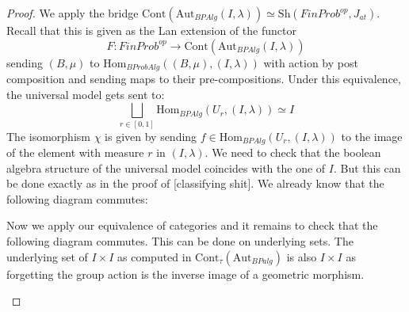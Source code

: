 \documentclass[a4paper]{amsproc}
\theoremstyle{plain}
\theoremstyle{definition}
\theoremstyle{remark}
\numberwithin{equation}{section}
\begin{document}
\begin{proof} We apply the bridge $\text{Cont}(\text{Aut}_{BPAlg}(I,\lambda))\simeq \text{Sh}(FinProb^{op},J_{at})$. Recall that this is given as the Lan extension of the functor 
\[F:FinProb^{op}\rightarrow \text{Cont}(\text{Aut}_{BPAlg}(I,\lambda))\]
 sending $(B,\mu)$ to $\text{Hom}_{BProbAlg}((B,\mu),(I,\lambda))$ with action by post composition and sending maps to their pre-compositions. Under this equivalence, the universal model gets sent to:
\[\bigsqcup_{r\in [0,1]} \text{Hom}_{BPAlg}(U_r, (I,\lambda))\simeq I \]
The isomorphism $\chi$ is given by sending $f\in \text{Hom}_{BPAlg}(U_r, (I,\lambda))$ to the image of the element with measure $r$ in $(I,\lambda)$. We need to check that the boolean algebra structure of the universal model coincides with the one of $I$. But this can be done exactly as in the proof of [classifying shit]. We already know that the following diagram commutes:
\begin{center}
\end{center}
Now we apply our equivalence of categories and it remains to check that the following diagram commutes. This can be done on underlying sets. The underlying set of $I\times I$ as computed in $\text{Cont}_{\tau}(\text{Aut}_{BPalg})$ is also $I\times I$ as forgetting the group action is the inverse image of a geometric morphism.
\begin{center}
\end{center}
\end{proof}
\end{document}
